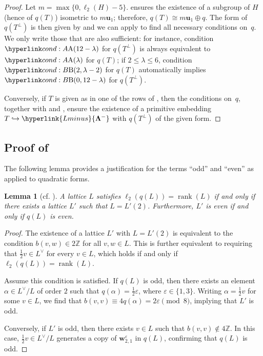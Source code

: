\documentclass[a4paper]{amsart}
\theoremstyle{definition}
\theoremstyle{plain}
\newtheorem{lemma}[definition]{Lemma}
\DeclareMathOperator{\rank}{rank}
\newcommand{\IZ}{\mathbb{Z}}
\newcommand{\bu}{\mathbf{u}}
\newcommand{\bw}{\mathbf{w}}
\newcommand{\bLambda}{\mathbf{\Lambda}}
\newcommand{\Lminus}{\hyperlink{Lminus}{\bLambda^-}}
\begin{document}
\begin{proof}
Let \(m = \max\{ 0, \ell_2(H) - 5\}\).  ensures the existence of a subgroup of \(H\) (hence of \(q(T)\)) isometric to \(m\bu_1\); therefore, \(q(T) \cong m\bu_1 \oplus q\). 
The form of \(q(T^\perp)\) is then given by  and we can apply  to find all necessary conditions on~\(q\). 
We only write those that are also sufficient: for instance, condition \(\condA{12 - \lambda}\) for \(q(T^\perp)\) is always equivalent to \(\condA{\lambda}\) for \(q(T)\); if \(2 \leq \lambda \leq 6\), condition \(\condB{2,\lambda -2}\) for \(q(T)\) automatically implies \(\condB{0,12-\lambda}\) for \(q(T^\perp)\). 

Conversely, if \(T\) is given as in one of the rows of , then the conditions on~\(q\), together with  and , ensure the existence of a primitive embedding \(T \hookrightarrow \Lminus\) with \(q(T^\perp)\) of the given form.
\end{proof}



\subsection{Proof of \texorpdfstring{}{}} \label{subsec:proof-transc-thm}

The following lemma provides a justification for the terms ``odd'' and ``even'' as applied to quadratic forms.

\begin{lemma}[cf. {\cite[end of p. 130]{Nikulin:int.sym.bilinear.forms}}] \label{lem:l2=rank}
A lattice \(L\) satisfies \(\ell_2(q(L)) = \rank(L)\) if and only if there exists a lattice \(L'\) such that \(L = L'(2)\). Furthermore, \(L'\) is even if and only if \(q(L)\) is even.
\end{lemma}

\begin{proof}
The existence of a lattice \(L'\) with \(L = L'(2)\) is equivalent to the condition \(b(v, w) \in 2\IZ\) for all \(v, w \in L\). This is further equivalent to requiring that \(\frac{1}{2}v \in L^\vee\) for every \(v \in L\), which holds if and only if \(\ell_2(q(L)) = \rank(L)\).

Assume this condition is satisfied. If \(q(L)\) is odd, then there exists an element \(\alpha \in L^\vee/L\) of order \(2\) such that \(q(\alpha) = \frac{1}{2}\varepsilon\), where \(\varepsilon \in \{1, 3\}\). Writing \(\alpha = \frac{1}{2}v\) for some \(v \in L\), we find that \(b(v, v) \equiv 4q(\alpha) = 2\varepsilon \pmod{8}\), implying that \(L'\) is odd.

Conversely, if \(L'\) is odd, then there exists \(v \in L\) such that \(b(v, v) \not\in 4\IZ\). In this case, \(\frac{1}{2}v \in L^\vee/L\) generates a copy of \(\bw_{2,1}^\varepsilon\) in \(q(L)\), confirming that \(q(L)\) is odd.
\end{proof}
\end{document}
